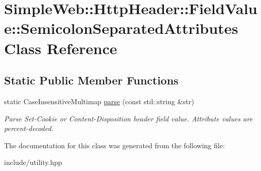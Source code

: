 \hypertarget{classSimpleWeb_1_1HttpHeader_1_1FieldValue_1_1SemicolonSeparatedAttributes}{}\section{Simple\+Web\+:\+:Http\+Header\+:\+:Field\+Value\+:\+:Semicolon\+Separated\+Attributes Class Reference}
\label{classSimpleWeb_1_1HttpHeader_1_1FieldValue_1_1SemicolonSeparatedAttributes}
\subsection*{Static Public Member Functions}
\begin{DoxyCompactItemize}
\item 
static Case\+Insensitive\+Multimap \hyperlink{classSimpleWeb_1_1HttpHeader_1_1FieldValue_1_1SemicolonSeparatedAttributes_a5e8bd320a558aecdbc4b45fe671a6453}{parse} (const std\+::string \&str)\hypertarget{classSimpleWeb_1_1HttpHeader_1_1FieldValue_1_1SemicolonSeparatedAttributes_a5e8bd320a558aecdbc4b45fe671a6453}{}\label{classSimpleWeb_1_1HttpHeader_1_1FieldValue_1_1SemicolonSeparatedAttributes_a5e8bd320a558aecdbc4b45fe671a6453}

\begin{DoxyCompactList}\small\item\em Parse Set-\/\+Cookie or Content-\/\+Disposition header field value. Attribute values are percent-\/decoded. \end{DoxyCompactList}\end{DoxyCompactItemize}


The documentation for this class was generated from the following file\+:\begin{DoxyCompactItemize}
\item 
include/utility.\+hpp\end{DoxyCompactItemize}
